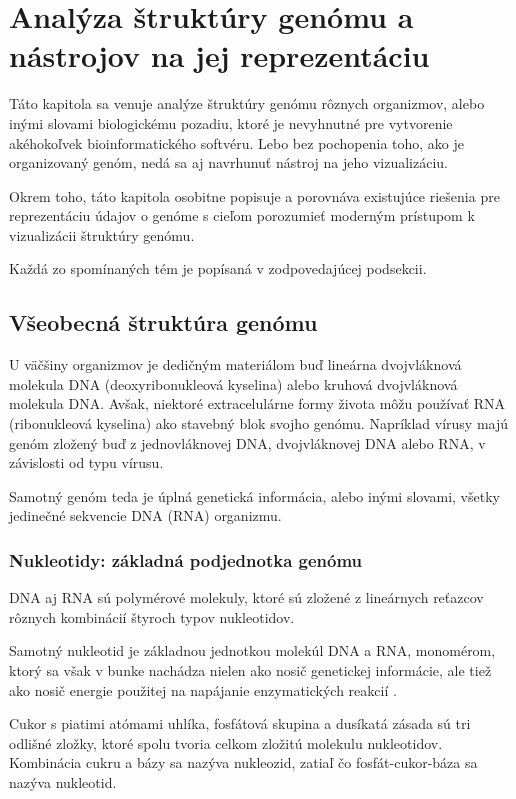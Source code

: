 
\chapter{Analýza štruktúry genómu a nástrojov na jej reprezentáciu}

Táto kapitola sa venuje analýze štruktúry genómu rôznych organizmov, alebo inými slovami biologickému pozadiu, ktoré je nevyhnutné pre vytvorenie akéhokoľvek bioinformatického softvéru.
Lebo bez pochopenia toho, ako je organizovaný genóm, nedá sa aj navrhunuť nástroj na jeho vizualizáciu.

Okrem toho, táto kapitola osobitne popisuje a porovnáva existujúce riešenia pre reprezentáciu údajov o genóme s cieľom porozumieť moderným prístupom k vizualizácii štruktúry genómu. 

Každá zo spomínaných tém je popísaná v zodpovedajúcej podsekcii.

\section{Všeobecná štruktúra genómu}
U väčšiny organizmov je dedičným materiálom buď lineárna dvojvláknová molekula DNA (deoxyribonukleová kyselina) alebo kruhová dvojvláknová molekula DNA.
Avšak, niektoré extracelulárne formy života môžu používať RNA (ribonukleová kyselina) ako stavebný blok svojho genómu.
Napríklad vírusy majú genóm zložený buď z jednovláknovej DNA, dvojvláknovej DNA alebo RNA, v závislosti od typu vírusu.

Samotný genóm teda je úplná genetická informácia, alebo inými slovami, všetky jedinečné sekvencie DNA (RNA) organizmu.

\subsection{Nukleotidy: základná podjednotka genómu}
DNA aj RNA sú polymérové molekuly, ktoré sú zložené z lineárnych reťazcov rôznych kombinácií štyroch typov nukleotidov.

Samotný nukleotid je základnou jednotkou molekúl DNA a RNA, monomérom, ktorý sa však v bunke nachádza nielen ako nosič genetickej informácie,
ale tiež ako nosič energie použitej na napájanie enzymatických reakcií \cite{AnalysisOfGenesAndGenomes}. 

Cukor s piatimi atómami uhlíka, fosfátová skupina a dusíkatá zásada sú tri odlišné zložky, ktoré spolu tvoria celkom zložitú molekulu nukleotidov.
Kombinácia cukru a bázy sa nazýva nukleozid, zatiaľ čo fosfát-cukor-báza sa nazýva nukleotid. 

